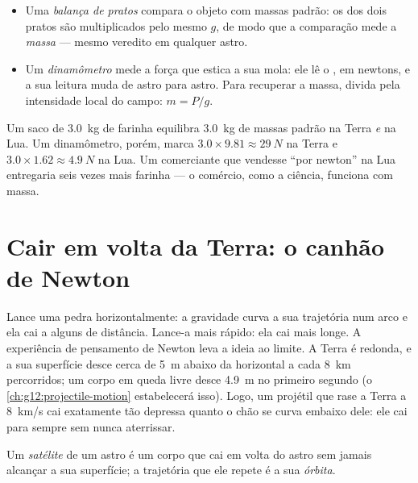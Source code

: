 \begin{method}\label{met:g10:universal-gravitation:instruments}
\begin{itemize}
  \item Uma \emph{balança de pratos} compara o objeto com massas padrão:
        os  dos dois pratos são multiplicados pelo mesmo $g$, de
        modo que a comparação mede a \emph{massa} --- mesmo veredito em
        qualquer astro.
  \item Um \emph{dinamômetro} mede a força que estica a sua mola: ele lê
        o \emph{}, em newtons, e a sua leitura muda de astro para
        astro. Para recuperar a massa, divida pela intensidade local do
        campo: $m = P/g$.
\end{itemize}
\end{method}

\begin{example}\label{ex:g10:universal-gravitation:flour}
Um saco de \qty{3.0}{kg} de farinha equilibra \qty{3.0}{kg} de massas
padrão na Terra \emph{e} na Lua. Um dinamômetro, porém, marca
$3.0 \times 9.81 \approx \qty{29}{N}$ na Terra e
$3.0 \times 1.62 \approx \qty{4.9}{N}$ na Lua. Um comerciante que
vendesse ``por newton'' na Lua entregaria seis vezes mais farinha --- o
comércio, como a ciência, funciona com massa.
\end{example}

\section{Cair em volta da Terra: o canhão de Newton}

Lance uma pedra horizontalmente: a gravidade curva a sua trajetória num
arco e ela cai a alguns  de distância. Lance-a mais rápido: ela cai
mais longe. A experiência de pensamento de Newton leva a ideia ao limite.
A Terra é redonda, e a sua superfície desce cerca de \qty{5}{m} abaixo da
horizontal a cada \qty{8}{km} percorridos; um corpo em queda livre desce
\qty{4.9}{m} no primeiro segundo (o
\cref{ch:g12:projectile-motion} estabelecerá isso). Logo, um projétil que
rase a Terra a \qty{8}{km/s} cai exatamente tão depressa quanto o chão se
curva embaixo dele: ele cai para sempre sem nunca aterrissar.

\begin{definition}\label{def:g10:universal-gravitation:satellite}
Um \emph{satélite} de um astro é um corpo que cai em
volta do astro sem jamais alcançar a sua superfície; a trajetória que ele
repete é a sua \emph{órbita}.
\end{definition}

